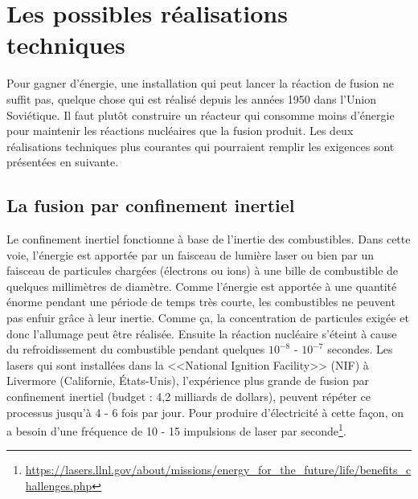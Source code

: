 \documentclass[12pt,a4paper]{article}
\begin{document}
\section{Les possibles réalisations techniques}
Pour gagner d'énergie, une installation qui peut lancer la réaction de fusion ne suffit pas, quelque chose qui est réalisé depuis les années 1950 dans l'Union Soviétique. Il faut plutôt construire un réacteur qui consomme moins d'énergie pour maintenir les réactions nucléaires que la fusion produit. Les deux réalisations techniques plus courantes qui pourraient remplir les exigences sont présentées en suivante.

\subsection{La fusion par confinement inertiel}
Le confinement inertiel fonctionne à base de l'inertie des combustibles. Dans cette voie, l'énergie est apportée par un faisceau de lumière laser ou bien par un faisceau de particules chargées (électrons ou ions) à une bille de combustible de quelques millimètres de diamètre. Comme l'énergie est apportée à une quantité énorme pendant une période de temps très courte, les combustibles ne peuvent pas enfuir grâce à leur inertie. Comme ça, la concentration de particules exigée et donc l'allumage peut être réalisée. Ensuite la réaction nucléaire s'éteint à cause du refroidissement du combustible pendant quelques $10^{-8}$ - $10^{-7}$ secondes. Les lasers qui sont installées dans la <<National Ignition Facility>> (NIF) à Livermore (Californie, États-Unis), l'expérience plus grande de fusion par confinement inertiel (budget : 4,2 milliards de dollars), peuvent répéter ce processus jusqu'à 4 - 6 fois par jour. Pour produire d'électricité à cette façon, on a besoin d'une fréquence de 10 - 15 impulsions de laser par seconde\footnote{\url{https://lasers.llnl.gov/about/missions/energy_for_the_future/life/benefits_challenges.php}}.
\end{document}
